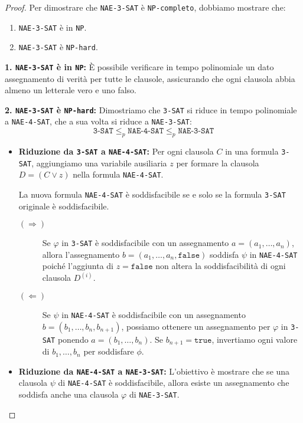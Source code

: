\begin{proof}
Per dimostrare che \texttt{NAE-3-SAT} è \texttt{NP-completo}, dobbiamo mostrare che:
\begin{enumerate}
    \item \texttt{NAE-3-SAT} è in \texttt{NP}.
    \item \texttt{NAE-3-SAT} è \texttt{NP-hard}.
\end{enumerate}
\textbf{1. \texttt{NAE-3-SAT} è in \texttt{NP}:} È possibile verificare in tempo
polinomiale un dato assegnamento di verità per tutte le clausole, assicurando che
ogni clausola abbia almeno un letterale vero e uno falso.

\textbf{2. \texttt{NAE-3-SAT} è \texttt{NP-hard}:} Dimostriamo che \texttt{3-SAT}
si riduce in tempo polinomiale a \texttt{NAE-4-SAT}, che a sua volta si riduce
a \texttt{NAE-3-SAT}:
\[
  \texttt{3-SAT} \leq_p \texttt{NAE-4-SAT} \leq_p \texttt{NAE-3-SAT}
\]
\begin{itemize}
    \item \textbf{Riduzione da \texttt{3-SAT} a \texttt{NAE-4-SAT}:} Per ogni
    clausola $C$ in una formula \texttt{3-SAT}, aggiungiamo una variabile ausiliaria
    $z$ per formare la clausola $D = (C \lor z)$ nella formula \texttt{NAE-4-SAT}.
    
    La nuova formula \texttt{NAE-4-SAT}
    è soddisfacibile se e solo se la formula \texttt{3-SAT} originale è soddisfacibile.
        \begin{description}
            \item[$(\Rightarrow)$] Se $\varphi$ in \texttt{3-SAT} è soddisfacibile con
            un assegnamento $a = (a_1, \dots, a_n)$, allora l'assegnamento $b =
            (a_1, \dots, a_n, \texttt{false})$ soddisfa $\psi$ in \texttt{NAE-4-SAT}
            poiché l'aggiunta di $z = \texttt{false}$ non altera la soddisfacibilità
            di ogni clausola $D^{(i)}$.
            \item[$(\Leftarrow)$] Se $\psi$ in \texttt{NAE-4-SAT} è soddisfacibile
            con un assegnamento $b = (b_1, \dots, b_n, b_{n+1})$, possiamo ottenere
            un assegnamento per $\varphi$ in \texttt{3-SAT} ponendo $a = (b_1, \dots, b_n)$.
            Se $b_{n+1} = \texttt{true}$, invertiamo ogni valore di $b_1, \dots, b_n$
        per soddisfare $\phi$.
        \end{description}
    \item \textbf{Riduzione da \texttt{NAE-4-SAT} a \texttt{NAE-3-SAT}:} 
    L'obiettivo è mostrare che se una clausola $\psi$ di \texttt{NAE-4-SAT} è 
    soddisfacibile, allora esiste un assegnamento che soddisfa anche una clausola
    $\varphi$ di \texttt{NAE-3-SAT}.


\end{itemize}
\end{proof}
